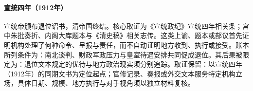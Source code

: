 \hypertarget{ledger:EQ-1912-QING-ABDICATION}{}\paragraph{宣统四年（1912年）}宣统帝颁布退位诏书，清帝国终结。核心取证为《宣统政纪》宣统四年相关条；宫中朱批奏折、内阁大库题本与《清史稿》相关志传。这类上谕、题本或部议首先证明机构处理了何种命令、呈报与责任，而不自动证明地方收到、执行或接受。账本所列条件为：南北谈判、财政军政压力与皇室待遇安排共同促成退位。其后果被限定为：退位文本规定的优待与地方政治现实须分别追踪。取证保留：以宣统四年（1912年）的同期文书为定位起点；官修记录、奏报或外交文本服务特定机构立场，具体日期、规模、地方执行与对手视角须以独立材料复核。
